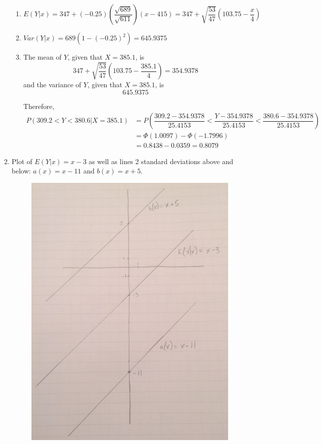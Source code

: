 \documentclass{article}
\newcommand\mfrac[2]{\left(\dfrac{#1}{#2}\right)}
\begin{document}
\begin{enumerate}
\begin{enumerate}
       \item
	$E(Y|x) = 347 + (-0.25)\mfrac{\sqrt{689}}{\sqrt{611}}(x-415) 
	  = 347 + \sqrt{\dfrac{53}{47}}\left(103.75 - \dfrac{x}{4}\right)$
       
       \item
	$Var(Y|x) = 689(1 - (-0.25)^2) = 645.9375$
       
       \item
	The mean of $Y$, given that $X=385.1$, is
	$$347 + \sqrt{\dfrac{53}{47}}\left(103.75 - \dfrac{385.1}{4}\right) = 354.9378$$
	and the variance of $Y$, given that $X=385.1$, is
	$$645.9375$$
	
	Therefore,
	\begin{align*}
	 P(309.2 < Y < 380.6 | X=385.1) &= P\left(\dfrac{309.2 - 354.9378}{25.4153} < \dfrac{Y-354.9378}{25.4153} < \dfrac{380.6-354.9378}{25.4153}\right) \\
	  &= \Phi(1.0097) - \Phi(-1.7996) \\
	  &= 0.8438 - 0.0359 = 0.8079
	\end{align*}
      \end{enumerate}
     \addtocounter{enumi}{1}
     
     \newpage
     \item
      Plot of $E(Y|x) = x-3$ as well as lines 2 standard deviations above and below: $a(x) = x-11$ and 
      $b(x) = x+5$.
      \begin{figure}[h!]
	\centering
	\includegraphics[scale=.6,keepaspectratio=true]{./images/Plot.jpg}
      \end{figure}
    \end{enumerate}
    
\end{document}
